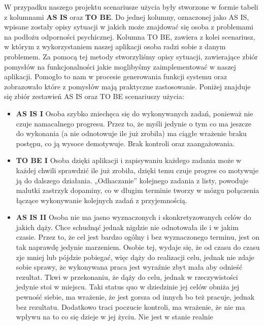 W przypadku naszego projektu scenariusze użycia były stworzone w formie tabeli z
kolumnami \textbf{AS IS} oraz \textbf{TO BE}. Do jednej kolumny, oznaczonej jako
AS IS, wpisane zostały opisy sytuacji w jakich może znajdować się osoba z
problemami na podłożu odporności psychicznej. Kolumna TO BE, zawiera z kolei
scenariusz, w którym z wykorzystaniem naszej aplikacji osoba radzi sobie z danym
problemem. Za pomocą tej metody stworzyliśmy opisy sytuacji, zawierające zbiór
pomysłów na funkcjonalności jakie moglibyśmy zaimplementować w naszej aplikacji.
Pomogło to nam w procesie generowania funkcji systemu oraz zobrazowało które z
pomysłów mają praktyczne zastosowanie. Poniżej znajduje się zbiór zestawień AS
IS oraz TO BE scenariuszy użycia:
\begin{itemize}
    \item \textbf{AS IS I} Osoba szybko zniechęca się do wykonywanych zadań,
          ponieważ nie czuje namacalnego progresu. Przez to, że myśli jedynie o
          tym co ma jeszcze do wykonania (a nie odnotowuje ile już zrobiła) ma
          ciągłe wrażenie braku postępu, co ją wysoce demotywuje. Brak kontroli
          oraz zaangażowania.
    \item \textbf{TO BE I} Osoba dzięki aplikacji i zapisywaniu każdego zadania
          może w każdej chwili sprawdzić ile już zrobiła, dzięki temu czuje
          progres co motywuje ją do dalszego działania. „Odhaczanie” kolejnego
          zadania z listy, powoduje malutki zastrzyk dopaminy, co w długim
          terminie tworzy w mózgu połączenia łączące wykonywanie kolejnych zadań
          z przyjemnością.
    \item \textbf{AS IS II} Osoba nie ma jasno wyznaczonych i skonkretyzowanych
          celów do jakich dąży. Chce schudnąć jednak nigdzie nie odnotowała ile
          i w jakim czasie. Przez to, że cel jest bardzo ogólny i bez
          wyznaczonego terminu, jest on tak naprawdę jedynie marzeniem. Osobie
          tej, wydaje się, że od czasu do czasu zje mniej lub pójdzie pobiegać,
          więc dąży do realizacji celu, jednak nie zdaje sobie sprawy, że
          wykonywana praca jest wyraźnie zbyt mała aby odnieść rezultat. Tkwi w
          przekonaniu, że dąży do celu, jednak w rzeczywistości jedynie stoi w
          miejscu. Taki status quo w dziedzinie jej celów obniża jej pewność
          siebie, ma wrażenie, że jest gorsza od innych bo też pracuje, jednak
          bez rezultatu. Dodatkowo traci poczucie kontroli, ma wrażenie, że nie
          ma wpływu na to co się dzieje w jej życiu. Nie jest w stanie realnie

\end{itemize}
